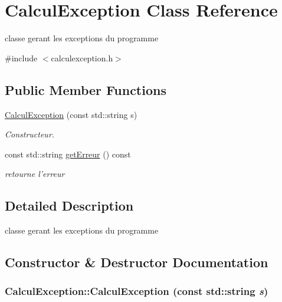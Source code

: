 \hypertarget{classCalculException}{
\section{CalculException Class Reference}
\label{classCalculException}
}


classe gerant les exceptions du programme  




{\ttfamily \#include $<$calculexception.h$>$}

\subsection*{Public Member Functions}
\begin{DoxyCompactItemize}
\item 
\hyperlink{classCalculException_a1b2321ee5a5aee7a5a939d19de8bb41c}{CalculException} (const std::string s)
\begin{DoxyCompactList}\small\item\em Constructeur. \item\end{DoxyCompactList}\item 
\hypertarget{classCalculException_a3c5a102baabcff71c5e988c9450022ae}{
const std::string \hyperlink{classCalculException_a3c5a102baabcff71c5e988c9450022ae}{getErreur} () const }
\label{classCalculException_a3c5a102baabcff71c5e988c9450022ae}

\begin{DoxyCompactList}\small\item\em retourne l'erreur \item\end{DoxyCompactList}\end{DoxyCompactItemize}


\subsection{Detailed Description}
classe gerant les exceptions du programme 

\subsection{Constructor \& Destructor Documentation}
\hypertarget{classCalculException_a1b2321ee5a5aee7a5a939d19de8bb41c}{
\subsubsection[{CalculException}]{\setlength{\rightskip}{0pt plus 5cm}CalculException::CalculException (const std::string {\em s})}}
\label{classCalculException_a1b2321ee5a5aee7a5a939d19de8bb41c}


